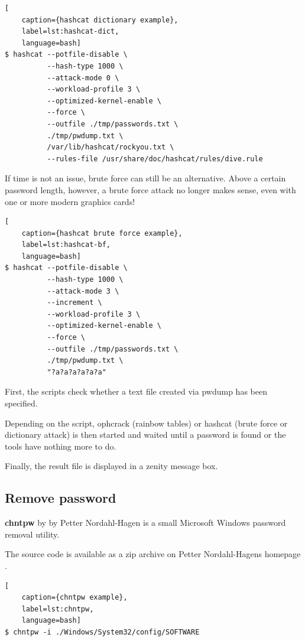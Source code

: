 \begin{lstlisting}[
    caption={hashcat dictionary example},
    label=lst:hashcat-dict,
    language=bash]
$ hashcat --potfile-disable \
          --hash-type 1000 \
          --attack-mode 0 \
          --workload-profile 3 \
          --optimized-kernel-enable \
          --force \
          --outfile ./tmp/passwords.txt \
          ./tmp/pwdump.txt \
          /var/lib/hashcat/rockyou.txt \
          --rules-file /usr/share/doc/hashcat/rules/dive.rule
\end{lstlisting}

\noindent If time is not an issue, brute force can still be an alternative. Above a certain password length, however, a brute force attack no longer makes sense, even with one or more modern graphics cards!

\begin{lstlisting}[
    caption={hashcat brute force example},
    label=lst:hashcat-bf,
    language=bash]
$ hashcat --potfile-disable \
          --hash-type 1000 \
          --attack-mode 3 \
          --increment \
          --workload-profile 3 \
          --optimized-kernel-enable \
          --force \
          --outfile ./tmp/passwords.txt \
          ./tmp/pwdump.txt \
          "?a?a?a?a?a?a"
\end{lstlisting}

\noindent First, the scripts check whether a text file created via pwdump has been specified.

Depending on the script, ophcrack (rainbow tables) or hashcat (brute force or dictionary attack) is then started and waited until a password is found or the tools have nothing more to do.

Finally, the result file is displayed in a zenity message box.

\subsection{Remove password}

\textbf{chntpw} by by Petter Nordahl-Hagen is a small Microsoft Windows password removal utility.

The source code is available as a zip archive on Petter Nordahl-Hagens homepage \cite{Chntpw}.

\begin{lstlisting}[
    caption={chntpw example},
    label=lst:chntpw,
    language=bash]
$ chntpw -i ./Windows/System32/config/SOFTWARE
\end{lstlisting}

